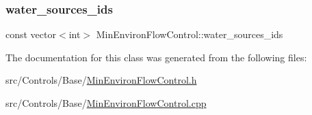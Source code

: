 \subsubsection{\texorpdfstring{water\+\_\+sources\+\_\+ids}{water\_sources\_ids}}
{\footnotesize\ttfamily const vector$<$int$>$ Min\+Environ\+Flow\+Control\+::water\+\_\+sources\+\_\+ids}



The documentation for this class was generated from the following files\+:\begin{DoxyCompactItemize}
\item 
src/\+Controls/\+Base/\mbox{\hyperlink{MinEnvironFlowControl_8h}{Min\+Environ\+Flow\+Control.\+h}}\item 
src/\+Controls/\+Base/\mbox{\hyperlink{MinEnvironFlowControl_8cpp}{Min\+Environ\+Flow\+Control.\+cpp}}\end{DoxyCompactItemize}
